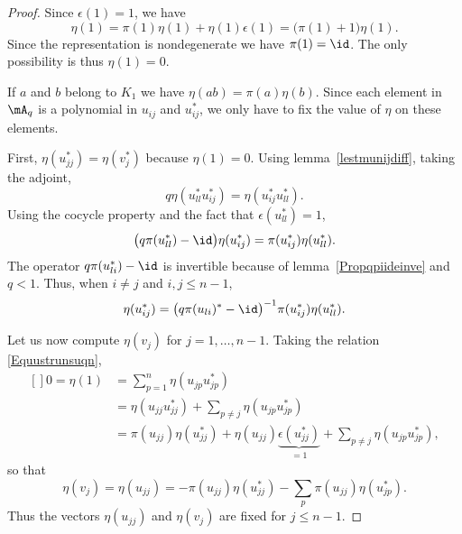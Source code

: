 \begin{proof}
	Since $\epsilon(1)=1$, we have
	\begin{equation}
		\eta(1)=\pi(1)\eta(1)+\eta(1)\epsilon(1)=\big( \pi(1)+1 \big)\eta(1).
	\end{equation}
	Since the representation is nondegenerate we have $\pi(1)=\id$. The only possibility is thus $\eta(1)=0$.

	If $a$ and $b$ belong to $K_1$ we have $\eta(ab)=\pi(a)\eta(b)$. Since each element in $\mA_q$ is a polynomial in $u_{ij}$ and $u_{ij}^*$, we only have to fix the value of $\eta$ on these elements.

	First, $\eta(u_{jj}^*)=\eta(v_j^*)$ because $\eta(1)=0$. Using lemma~\ref{lestmunijdiff}, taking the adjoint,
	\begin{equation}
		q\eta(u_{ll}^*u_{ij}^*)=\eta(u_{ij}^*u_{ll}^*).
	\end{equation}
	Using the cocycle property and the fact that $\epsilon(u_{ll}^*)=1$,
	\begin{equation}
		\big( q\pi(u_{ll}^*)-\id \big)\eta(u_{ij}^*)=\pi(u_{ij}^*)\eta(u_{ll}^*).
	\end{equation}
	The operator $q\pi(u_{li}^*)-\id$ is invertible because of lemma~\ref{Propqpiideinve} and $q<1$. Thus, when $i\neq j$ and $i,j\leq n-1$,
	\begin{equation}
		\eta(u_{ij}^*)=\big( q\pi(u_{li})^*-\id \big)^{-1}\pi(u_{ij}^*)\eta(u_{ll}^*).
	\end{equation}

	Let us now compute $\eta(v_j)$ for $j=1,\ldots,n-1$. Taking the relation \eqref{Equustrunsuqn},
	\begin{equation}
		\begin{aligned}[]
			0=\eta(1) & =\sum_{p=1}^n\eta(u_{jp}u_{jp}^*)                                                                               \\
			          & =\eta(u_{jj}u_{jj}^*)+\sum_{p\neq j}\eta(u_{jp}u_{jp}^*)                                                        \\
			          & =\pi(u_{jj})\eta(u_{jj}^*)+\eta(u_{jj})\underbrace{\epsilon(u_{jj}^*)}_{=1}+\sum_{p\neq j}\eta(u_{jp}u_{jp}^*),
		\end{aligned}
	\end{equation}
	so that
	\begin{equation}        \label{Eqetaujjpiu}
		\eta(v_j)=\eta(u_{jj})=-\pi(u_{jj})\eta(u_{jj}^*)-\sum_p\pi(u_{jj})\eta(u_{jp}^*).
	\end{equation}
	Thus the vectors $\eta(u_{jj})$ and $\eta(v_j)$ are fixed for $j\leq n-1$.


\end{proof}
